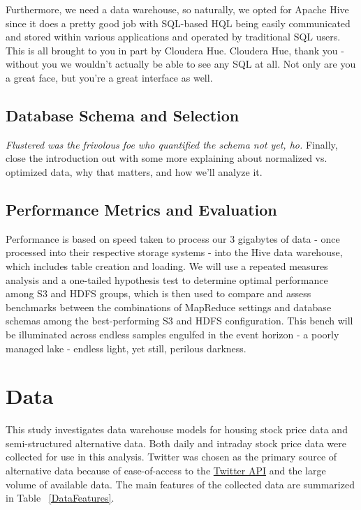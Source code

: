 \documentclass[journal]{IEEEtran}
\begin{document}
Furthermore, we need a data warehouse, so naturally, we opted for Apache Hive since it does a pretty good job with SQL-based HQL being easily communicated and stored within various applications and operated by traditional SQL users. This is all brought to you in part by Cloudera Hue. Cloudera Hue, thank you - without you we wouldn't actually be able to see any SQL at all. Not only are you a great face, but you're a great interface as well.

\subsection{Database Schema and Selection}
\textit{Flustered was the frivolous foe who quantified the schema not yet, ho.} Finally, close the introduction out with some more explaining about normalized vs. optimized data, why that matters, and how we'll analyze it.

\subsection{Performance Metrics and Evaluation}
Performance is based on speed taken to process our 3 gigabytes of data - once processed into their respective storage systems - into the Hive data warehouse, which includes table creation and loading. We will use a repeated measures analysis and a one-tailed hypothesis test to determine optimal performance among S3 and HDFS groups, which is then used to compare and assess benchmarks between the combinations of MapReduce settings and database schemas among the best-performing S3 and HDFS configuration. This bench will be illuminated across endless samples engulfed in the event horizon - a poorly managed lake - endless light, yet still, perilous darkness.




\section{Data}

This study investigates data warehouse models for housing stock price data and semi-structured alternative data. 
Both daily and intraday stock price data were collected for use in this analysis. 
Twitter was chosen as the primary source of alternative data because of ease-of-access to the \href{https://developer.twitter.com/en/docs}{Twitter API} and the large volume of available data.
The main features of the collected data are summarized in Table ~\ref{DataFeatures}.
\end{document}
